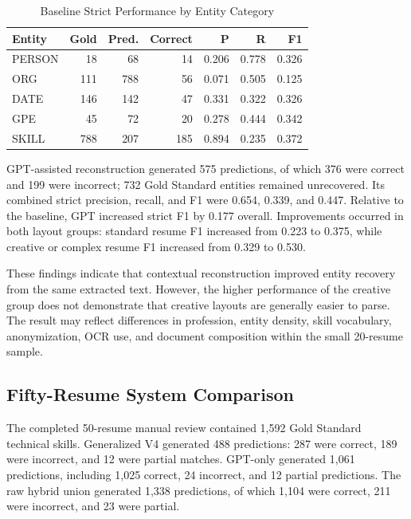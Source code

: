 \documentclass[conference]{IEEEtran}
\begin{document}
\begin{table}[t]
\caption{Baseline Strict Performance by Entity Category}
\label{tab:baseline_entity_results}
\centering
\scriptsize
\setlength{\tabcolsep}{3.5pt}
\begin{tabular}{lrrrrrr}
\toprule
Entity & Gold & Pred. & Correct & P & R & F1 \\
\midrule
PERSON & 18 & 68 & 14 & 0.206 & 0.778 & 0.326 \\
ORG & 111 & 788 & 56 & 0.071 & 0.505 & 0.125 \\
DATE & 146 & 142 & 47 & 0.331 & 0.322 & 0.326 \\
GPE & 45 & 72 & 20 & 0.278 & 0.444 & 0.342 \\
SKILL & 788 & 207 & 185 & 0.894 & 0.235 & 0.372 \\
\bottomrule
\end{tabular}
\end{table}

GPT-assisted reconstruction generated 575 predictions, of which 376
were correct and 199 were incorrect; 732 Gold Standard entities remained
unrecovered. Its combined strict precision, recall, and F1 were 0.654,
0.339, and 0.447. Relative to the baseline, GPT increased strict F1 by
0.177 overall. Improvements occurred in both layout groups: standard
resume F1 increased from 0.223 to 0.375, while creative or complex resume
F1 increased from 0.329 to 0.530.

These findings indicate that contextual reconstruction improved entity
recovery from the same extracted text. However, the higher performance
of the creative group does not demonstrate that creative layouts are
generally easier to parse. The result may reflect differences in
profession, entity density, skill vocabulary, anonymization, OCR use,
and document composition within the small 20-resume sample.

\subsection{Fifty-Resume System Comparison}

The completed 50-resume manual review contained 1,592 Gold Standard
technical skills. Generalized V4 generated 488 predictions: 287 were
correct, 189 were incorrect, and 12 were partial matches. GPT-only
generated 1,061 predictions, including 1,025 correct, 24 incorrect, and
12 partial predictions. The raw hybrid union generated 1,338 predictions,
of which 1,104 were correct, 211 were incorrect, and 23 were partial.
\end{document}
